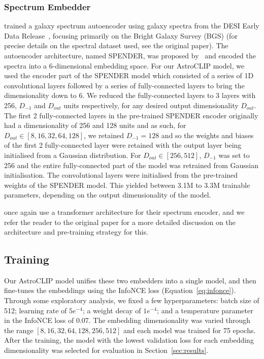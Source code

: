 \subsubsection{Spectrum Embedder}\label{subsubsec:spectrum-embedder}
\cite{liang2023} trained a galaxy spectrum autoencoder using galaxy spectra from the DESI Early Data Release~\citep{desiearly2023},
focusing primarily on the Bright Galaxy Survey (BGS) (for precise details on the spectral dataset used, see the original paper).
The autoencoder architecture, named SPENDER, was proposed by~\cite{melchior2022} and encoded the spectra into a 6-dimensional
embedding space.
For our AstroCLIP model, we used the encoder part of the SPENDER model which consisted of a series of 1D convolutional layers
followed by a series of fully-connected layers to bring the dimensionality down to 6.
We reduced the fully-connected layers to 3 layers with 256, $D_{-1}$ and $D_{out}$ units respectively, for any desired
output dimensionality $D_{out}$.
The first 2 fully-connected layers in the pre-trained SPENDER encoder originally had a dimensionality of 256 and 128 units
and as such, for $D_{out} \in [8, 16, 32, 64, 128]$, we retained $D_{-1}=128$ and so the weights and biases of the
first 2 fully-connected layer were retained with the output layer being initialised from a Gaussian distribution.
For $D_{out} \in [256, 512]$, $D_{-1}$ was set to 256 and the entire fully-connected part of the model was retrained
from Gaussian initialisation.
The convolutional layers were initialised from the pre-trained weights of the SPENDER model.
This yielded between 3.1M to 3.3M trainable parameters, depending on the output dimensionality of the model.

\cite{astroclip} once again use a transformer architecture for their spectrum encoder, and we refer the reader to the original
paper for a more detailed discussion on the architecture and pre-training strategy for this.

\subsection{Training}\label{subsec:training}
Our AstroCLIP model unifies these two embedders into a single model, and then fine-tunes the embeddings using the InfoNCE loss
(Equation~\eqref{eq:infonce}).
Through some exploratory analysis, we fixed a few hyperparameters: batch size of 512; learning rate of $5e^{-4}$; a weight
decay of $1e^{-4}$; and a temperature parameter in the InfoNCE loss of 0.07.
The embedding dimensionality was varied through the range $[8, 16, 32, 64, 128, 256, 512]$ and each model was trained for
75 epochs.
After the training, the model with the lowest validation loss for each embedding dimensionality was selected for evaluation
in Section~\eqref{sec:results}.








